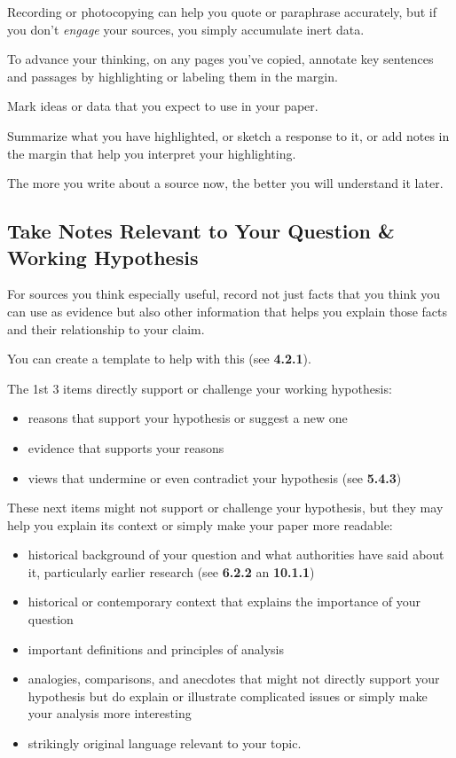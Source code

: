 \documentclass[oneside]{book}
\numberwithin{equation}{section}
\begin{document}
Recording or photocopying can help you quote or paraphrase accurately, but if you don't \textit{engage} your sources, you simply accumulate inert data.

To advance your thinking, on any pages you've copied, annotate key sentences and passages by highlighting or labeling them in the margin.

Mark ideas or data that you expect to use in your paper.

Summarize what you have highlighted, or sketch a response to it, or add notes in the margin that help you interpret your highlighting.

The more you write about a source now, the better you will understand it later.

\subsection{Take Notes Relevant to Your Question \& Working Hypothesis}
For sources you think especially useful, record not just facts that you think you can use as evidence but also other information that helps you explain those facts and their relationship to your claim.

You can create a template to help with this (see \textbf{4.2.1}).

%
The 1st 3 items directly support or challenge your working hypothesis:
\begin{itemize}
    \item reasons that support your hypothesis or suggest a new one
    \item evidence that supports your reasons
    \item views that undermine or even contradict your hypothesis (see \textbf{5.4.3})
\end{itemize}
%
These next items might not support or challenge your hypothesis, but they may help you explain its context or simply make your paper more readable:
\begin{itemize}
    \item historical background of your question and what authorities have said about it, particularly earlier research (see \textbf{6.2.2} an \textbf{10.1.1})
    \item historical or contemporary context that explains the importance of your question
    \item important definitions and principles of analysis
    \item analogies, comparisons, and anecdotes that might not directly support your hypothesis but do explain or illustrate complicated issues or simply make your analysis more interesting
    \item strikingly original language relevant to your topic.
\end{itemize}
\end{document}
